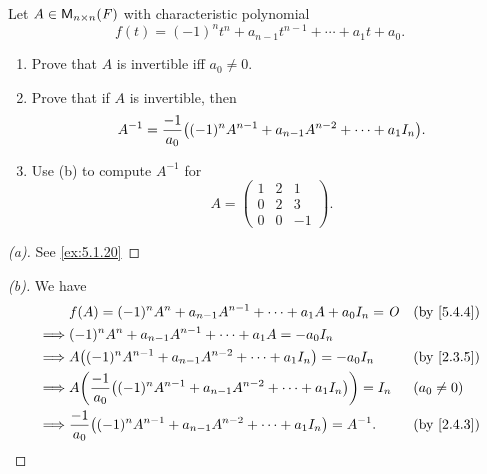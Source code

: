 \begin{ex}\label{ex:5.4.18}
	Let \(A \in \ms[n][n][\F]\) with characteristic polynomial
	\[
		f(t) = (-1)^n t^n + a_{n - 1} t^{n - 1} + \cdots + a_1 t + a_0.
	\]
	\begin{enumerate}
		\item Prove that \(A\) is invertible iff \(a_0 \neq 0\).
		\item Prove that if \(A\) is invertible, then
		      \[
			      A^{-1} = \frac{-1}{a_0} \pa{(-1)^n A^{n - 1} + a_{n - 1} A^{n - 2} + \cdots + a_1 I_n}.
		      \]
		\item Use (b) to compute \(A^{-1}\) for
		      \[
			      A = \begin{pmatrix}
				      1 & 2 & 1  \\
				      0 & 2 & 3  \\
				      0 & 0 & -1
			      \end{pmatrix}.
		      \]
	\end{enumerate}
\end{ex}

\begin{proof}[(a)]
	See \cref{ex:5.1.20}
\end{proof}

\begin{proof}[(b)]
	We have
	\begin{align*}
		         & f(A) = (-1)^n A^n + a_{n - 1} A^{n - 1} + \cdots + a_1 A + a_0 I_n = \zm                   &  & \by{5.4.4}   \\
		\implies & (-1)^n A^n + a_{n - 1} A^{n - 1} + \cdots + a_1 A = -a_0 I_n                                                 \\
		\implies & A \pa{(-1)^n A^{n - 1} + a_{n - 1} A^{n - 2} + \cdots + a_1 I_n} = -a_0 I_n                &  & \by{2.3.5}   \\
		\implies & A \pa{\frac{-1}{a_0} \pa{(-1)^n A^{n - 1} + a_{n - 1} A^{n - 2} + \cdots + a_1 I_n}} = I_n &  & (a_0 \neq 0) \\
		\implies & \frac{-1}{a_0} \pa{(-1)^n A^{n - 1} + a_{n - 1} A^{n - 2} + \cdots + a_1 I_n} = A^{-1}.    &  & \by{2.4.3}
	\end{align*}
\end{proof}

